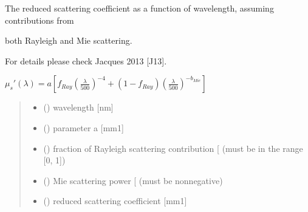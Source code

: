 \documentclass[letterpaper,10pt,english]{sphinxmanual}
\begin{document}
\begin{fulllineitems}
\label{\detokenize{04_scattering_coefficient:skinoptics.scattering_coefficient.rmus_Jacques}}
\pysigstartsignatures
{}
\pysigstopsignatures
\begin{DUlineblock}{0em}
\item[] The reduced scattering coefficient as a function of wavelength, assuming contributions from
\item[] both Rayleigh and Mie scattering.
\item[] For details please check Jacques 2013 {[}J13{]}.
\end{DUlineblock}

\sphinxAtStartPar
\(\mu_s'(\lambda) = a\left[f_{Ray}\left(\frac{\lambda}{500}\right)^{-4} + (1-f_{Ray})\left(\frac{\lambda}{500}\right)^{-b_{Mie}} \right]\)
\begin{quote}\begin{description}
\begin{itemize}
\item {} 
\sphinxAtStartPar
{} () \textendash{} wavelength {[}nm{]}

\item {} 
\sphinxAtStartPar
{} () \textendash{} parameter a {[}mm\sphinxhyphen{}1{]}

\item {} 
\sphinxAtStartPar
{} () \textendash{} fraction of Rayleigh scattering contribution {[}\sphinxhyphen{}{]} (must be in the range {[}0, 1{]})

\item {} 
\sphinxAtStartPar
{} () \textendash{} Mie scattering power {[}\sphinxhyphen{}{]} (must be nonnegative)

\end{itemize}

\sphinxAtStartPar
\begin{itemize}
\item {} 
\sphinxAtStartPar
{} () \textendash{} reduced scattering coefficient {[}mm\sphinxhyphen{}1{]}

\end{itemize}


\end{description}\end{quote}

\end{fulllineitems}
\end{document}
